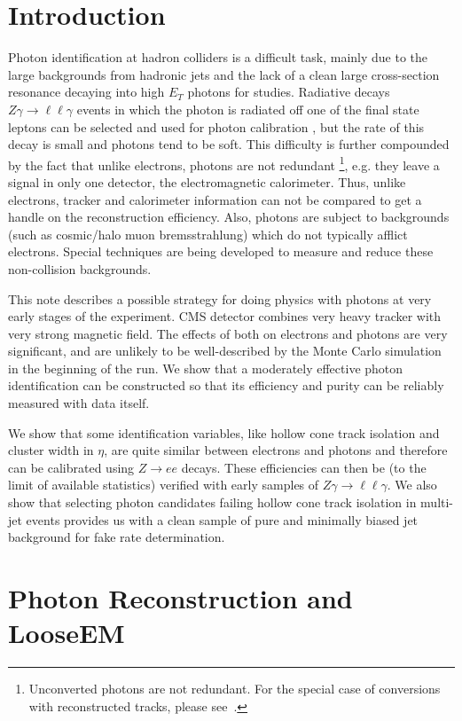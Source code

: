 \documentclass{cmspaper}
\begin{document}
\setcounter{page}{2}%

\section{Introduction}
Photon identification at hadron colliders is a difficult task, mainly due to the large backgrounds from hadronic jets and
the lack of a clean large cross-section resonance decaying into high $E_T$ photons for studies.  
Radiative decays $Z\gamma\rightarrow\ell\ell\gamma$ events in which the photon is radiated off one of the final state leptons 
can be selected and used for photon calibration \cite{uug_note}, but the rate of this decay is small and photons tend to be soft.
This difficulty is further compounded by the fact that unlike electrons,
photons are not redundant
\footnote{Unconverted photons are not redundant.  For the special case of conversions with reconstructed
tracks, please see~\cite{NancyConv}.}, e.g. they leave a signal in only one detector, the electromagnetic calorimeter.  
Thus, unlike electrons, tracker and calorimeter information can not be compared to get a handle on the reconstruction efficiency.
Also, photons are subject to backgrounds (such as cosmic/halo muon bremsstrahlung) which do not typically afflict electrons.
Special techniques are being developed to measure and reduce these non-collision backgrounds.

This note describes a possible strategy for doing physics with photons at very early stages of the experiment.
CMS detector combines very heavy tracker with very strong magnetic field. The effects of both on electrons and photons are very significant, and are 
unlikely to be well-described by the Monte Carlo simulation in the beginning of the run. 
We show that a moderately effective photon identification can be constructed so that its efficiency and purity can be reliably measured with
data itself.

We show that some identification variables, like hollow cone track isolation and cluster width in $\eta$, are quite similar between electrons and 
photons and therefore can be calibrated using $Z \rightarrow e e$ decays. 
These efficiencies can then be (to the limit of available statistics) verified with early samples of $Z\gamma\rightarrow\ell\ell\gamma$.  
We also show that selecting photon candidates failing hollow cone track isolation in multi-jet events 
provides us with a clean sample of pure and minimally biased jet background for fake rate determination.


\section{Photon Reconstruction and LooseEM}
\end{document}
